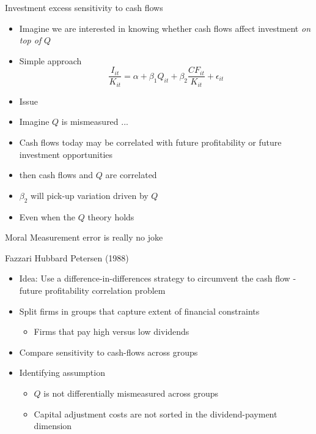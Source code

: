 \documentclass[11pt,aspectratio=169,xcolor={dvipsnames},hyperref={pdftex,pdfpagemode=UseNone,hidelinks,pdfdisplaydoctitle=true},usepdftitle=false]{beamer}
\begin{document}
\begin{frame}{Investment excess sensitivity to cash flows}
\begin{itemize}
\item Imagine we are interested in knowing whether cash flows affect investment \textit{on top of} $Q$
\pause
\item Simple approach
$$\frac{I_{it}}{K_{it}} = \alpha + \beta_1 Q_{it} + \beta_2 \frac{CF_{it}}{K_{it}} + \epsilon_{it}$$
\pause
\item Issue
\pause
\item Imagine $Q$ is mismeasured ...
\pause
\item Cash flows today may be correlated with future profitability or future investment opportunities
\pause
\item then cash flows and $Q$ are correlated
\pause
\item $\beta_2$ will pick-up variation driven by $Q$
\pause
\item Even when the $Q$ theory holds
\end{itemize}
\end{frame}

\begin{frame}{Moral}
Measurement error is really no joke
\end{frame}


\begin{frame}{Fazzari Hubbard Petersen (1988)}
\begin{itemize}
\item Idea: Use a difference-in-differences strategy to circumvent the cash flow - future profitability correlation problem
\pause
\item Split firms in groups that capture extent of financial constraints
\pause
\begin{itemize}
\item Firms that pay high versus low dividends
\end{itemize}
\pause
\item Compare sensitivity to cash-flows across groups
\pause
\item Identifying assumption
\begin{itemize}
\item $Q$ is not differentially mismeasured across groups
\pause
\item Capital adjustment costs are not sorted in the dividend-payment dimension
\end{itemize}
\end{itemize}
\end{frame}
\end{document}
